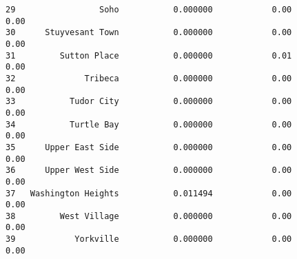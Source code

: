 \documentclass[11pt]{article}
\begin{document}
\begin{tcolorbox}[breakable, size=fbox, boxrule=.5pt, pad at break*=1mm, opacityfill=0]
\begin{Verbatim}[commandchars=\\\{\}]
29                 Soho           0.000000            0.00               0.00
30      Stuyvesant Town           0.000000            0.00               0.00
31         Sutton Place           0.000000            0.01               0.00
32              Tribeca           0.000000            0.00               0.00
33           Tudor City           0.000000            0.00               0.00
34           Turtle Bay           0.000000            0.00               0.00
35      Upper East Side           0.000000            0.00               0.00
36      Upper West Side           0.000000            0.00               0.00
37   Washington Heights           0.011494            0.00               0.00
38         West Village           0.000000            0.00               0.00
39            Yorkville           0.000000            0.00               0.00


\end{Verbatim}
\end{tcolorbox}
\end{document}
